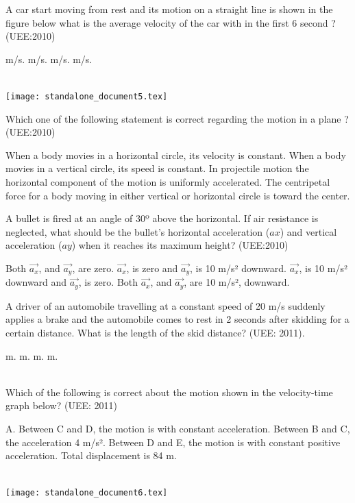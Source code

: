\documentclass[12pt,addpoints]{exam}
\begin{document}
\begin{questions}
					\question A car start moving from rest and its motion on a straight line is shown in the figure below what is the average velocity of the car with in the first 6 second ? (UEE:2010)\\
					\begin{oneparchoices}
						 m/s.
						 m/s.
						 m/s.
						 m/s.
					\end{oneparchoices} \\
                       \texttt{[image: standalone\_document5.tex]}
					
					
					\question  Which one of the following statement is correct regarding the motion in a plane ?(UEE:2010) \\
					\begin{choices}
						\choice  When a body movies in a horizontal circle, its velocity is constant.
						\choice When a body movies in a vertical circle, its speed is constant.
						\choice In projectile motion the horizontal component of the motion is uniformly accelerated.
						\choice  The centripetal force for a body moving in either vertical or horizontal circle is toward the center.
					\end{choices}
					
					\question A bullet is fired at an angle of 30º above the horizontal. If air resistance is neglected, what should be the bullet's horizontal acceleration ($ax$) and vertical acceleration ($ay$) when it reaches its maximum height? (UEE:2010) \\
					\begin{oneparchoices}
						\choice  Both $\vec{a_{x}}$, and $\vec{a_{y}}$, are zero.
						\choice  $\vec{a_{x}}$, is zero and  $\vec{a_{y}}$, is 10 m/s² downward.
						\choice  $\vec{a_{x}}$, is 10 m/s² downward and  $\vec{a_{y}}$, is zero.
						\choice Both  $\vec{a_{x}}$, and  $\vec{a_{y}}$, are 10 m/s², downward.
						
					\end{oneparchoices}
				
					\question A driver of an automobile travelling at a constant speed of 20 m/s suddenly applies a brake and the automobile comes to rest in 2 seconds after skidding for a certain distance. What is the length of the skid distance? (UEE: 2011). \\
					\begin{oneparchoices}
						\choice 400 m.
						\choice 10 m.
						\choice 40 m.
						\choice 20 m.
					\end{oneparchoices}
					\\ 
					\question Which of the following is correct about the motion shown in the velocity-time graph below? (UEE: 2011) \\
					\begin{oneparchoices}
						\choice A. Between C and D, the motion is with constant acceleration.
						\choice  Between B and C, the acceleration 4 m/s².
						\choice Between D and E, the motion is with constant positive acceleration.
						\choice Total displacement is 84 m.
					\end{oneparchoices} \\
						\texttt{[image: standalone\_document6.tex]}
					

\end{questions}
\end{document}
